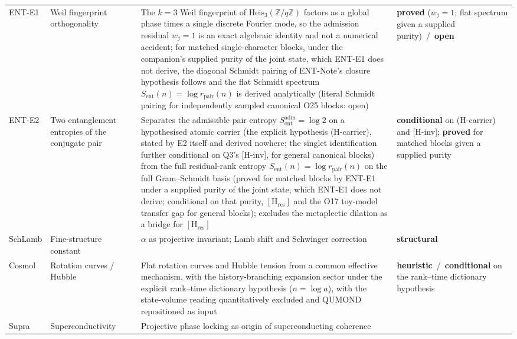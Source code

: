 \documentclass[11pt,a4paper]{article}
\newcommand{\Heis}{\mathrm{Heis}}
\newcommand{\sproved}{\textcolor{cproved}{\textbf{proved}}}
\newcommand{\sstruct}{\textcolor{cstruct}{\textbf{structural}}}
\newcommand{\sheur}{\textcolor{cheur}{\textbf{heuristic}}}
\newcommand{\sopen}{\textcolor{copen}{\textbf{open}}}
\newcommand{\scond}{\textcolor{ccond}{\textbf{conditional}}}
\begin{document}
\begin{longtable}{@{}p{1.70cm}p{2.9cm}p{1.3cm}p{6.25cm}>{\raggedright\arraybackslash}p{2.0cm}@{}}
      ENT-E1 & Weil fingerprint orthogonality & \cite{Beau2026ent1} &
      The $k{=}3$ Weil fingerprint of $\Heis_3(\mathbb{Z}/q\mathbb{Z})$ factors as a global phase times a
      single discrete Fourier mode, so the admission residual $w_j=1$ is an exact algebraic identity and
      not a numerical accident; for matched single-character blocks, under the companion's supplied purity
      of the joint state, which ENT-E1 does not derive, the diagonal Schmidt pairing of ENT-Note's closure
      hypothesis follows and the flat Schmidt spectrum
      $S_{\mathrm{ent}}(n)=\log r_{\mathrm{pair}}(n)$ is derived analytically (literal Schmidt pairing for independently sampled canonical O25 blocks: open) &
      \sproved{} ($w_j=1$; flat spectrum given a supplied purity)\ /\ \sopen \\[3pt]
      ENT-E2 & Two entanglement entropies of the conjugate pair & \cite{Beau2026ent2} &
      Separates the admissible pair entropy $S_{\mathrm{ent}}^{\mathrm{adm}} = \log 2$ on a
      hypothesised atomic carrier (the explicit hypothesis (H-carrier), stated by E2 itself and
      derived nowhere; the singlet identification further conditional on Q3's [H-inv], for
      general canonical blocks) from the full residual-rank entropy
      $S_{\mathrm{ent}}(n)=\log r_{\mathrm{pair}}(n)$ on the full Gram--Schmidt basis
      (proved for matched blocks by ENT-E1 under a supplied purity of the joint state, which ENT-E1 does
      not derive; conditional on that purity, $[\mathrm{H}_{\mathrm{res}}]$ and the O17 toy-model transfer
      gap for general blocks); excludes
      the metaplectic dilation as a bridge for $[\mathrm{H}_{\mathrm{res}}]$ &
      \scond{} on (H-carrier) and [H-inv]; \sproved{} for matched blocks given a supplied purity \\[3pt]
      SchLamb & Fine-structure constant & \cite{Beau2026f} &
      $\alpha$ as projective invariant; Lamb shift and Schwinger correction &
      \sstruct \\[3pt]
      Cosmol & Rotation curves / Hubble & \cite{Beau2026d} &
      Flat rotation curves and Hubble tension from a common effective mechanism, with the
      history-branching expansion sector under the explicit rank--time dictionary hypothesis ($n = \log a$),
      with the state-volume reading quantitatively excluded and QUMOND repositioned as input &
      \sheur\ /\ \scond{} on the rank--time dictionary hypothesis \\[3pt]
      Supra & Super\-conductivity & \cite{Beau2026g} &
      Projective phase locking as origin of superconducting coherence &

\end{longtable}
\end{document}
